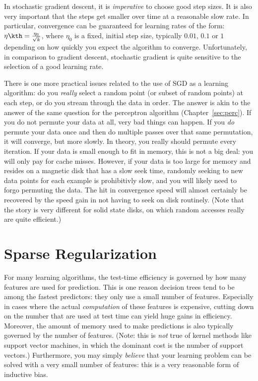 In stochastic gradient descent, it is \emph{imperative} to choose good
step sizes.  It is also very important that the steps get smaller over
time at a reasonable slow rate.  In particular, convergence can be
guaranteed for learning rates of the form: $\eta\kth = \frac {\eta_0}
{\sqrt{k}}$, where $\eta_0$ is a fixed, initial step size, typically
$0.01$, $0.1$ or $1$ depending on how quickly you expect the algorithm
to converge.  Unfortunately, in comparison to gradient descent,
stochastic gradient is quite sensitive to the selection of a good
learning rate.

There is one more practical issues related to the use of SGD as a
learning algorithm: do you \emph{really} select a random point (or
subset of random points) at each step, or do you stream through the
data in order.  The answer is akin to the answer of the same question
for the perceptron algorithm (Chapter~\ref{sec:perc}).  If you do not
permute your data at all, very bad things can happen.  If you
\emph{do} permute your data once and then do multiple passes over that
same permutation, it will converge, but more slowly.  In theory, you
really should permute every iteration.  If your data is small enough
to fit in memory, this is not a big deal: you will only pay for cache
misses.  However, if your data is too large for memory and resides on
a magnetic disk that has a slow seek time, randomly seeking to new
data points for each example is prohibitivly slow, and you will likely
need to forgo permuting the data.  The hit in convergence speed
will almost certainly be recovered by the speed gain in not having to
seek on disk routinely.  (Note that the story is very different for
solid state disks, on which random accesses really are quite
efficient.)


\section{Sparse Regularization}

For many learning algorithms, the test-time efficiency is governed by
how many features are used for prediction.  This is one reason
decision trees tend to be among the fastest predictors: they only use
a small number of features.  Especially in cases where the actual
\emph{computation} of these features is expensive, cutting down on the
number that are used at test time can yield huge gains in efficiency.
Moreover, the amount of memory used to make predictions is also
typically governed by the number of features.  (Note: this is
\emph{not} true of kernel methods like support vector machines, in
which the dominant cost is the number of support vectors.)
Furthermore, you may simply \emph{believe} that your learning problem
can be solved with a very small number of features: this is a very
reasonable form of inductive bias.

